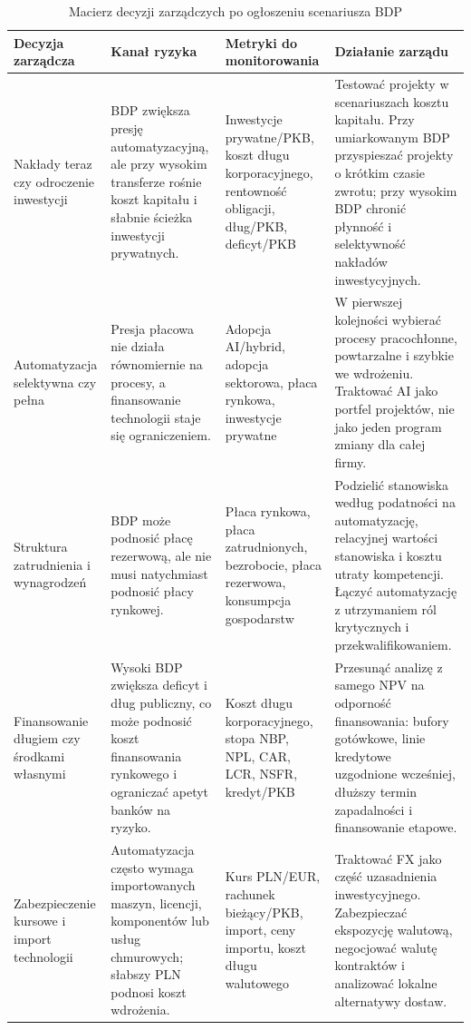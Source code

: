 \begin{table}[H]
\centering
\scriptsize
\caption{Macierz decyzji zarządczych po ogłoszeniu scenariusza BDP}
\label{tab:managerial-decision-matrix}
\begin{tabularx}{\textwidth}{@{}>{\raggedright\arraybackslash}p{}>{\raggedright\arraybackslash}p{}>{\raggedright\arraybackslash}p{}>{\raggedright\arraybackslash}X@{}}
\toprule
\textbf{Decyzja zarządcza} & \textbf{Kanał ryzyka} & \textbf{Metryki do monitorowania} & \textbf{Działanie zarządu} \\
\midrule
Nakłady teraz czy odroczenie inwestycji &
BDP zwiększa presję automatyzacyjną, ale przy wysokim transferze rośnie koszt kapitału i słabnie ścieżka inwestycji prywatnych. &
Inwestycje prywatne/PKB, koszt długu korporacyjnego, rentowność obligacji, dług/PKB, deficyt/PKB &
Testować projekty w scenariuszach kosztu kapitału. Przy umiarkowanym BDP przyspieszać projekty o krótkim czasie zwrotu; przy wysokim BDP chronić płynność i selektywność nakładów inwestycyjnych. \\
\addlinespace
Automatyzacja selektywna czy pełna &
Presja płacowa nie działa równomiernie na procesy, a finansowanie technologii staje się ograniczeniem. &
Adopcja AI/hybrid, adopcja sektorowa, płaca rynkowa, inwestycje prywatne &
W pierwszej kolejności wybierać procesy pracochłonne, powtarzalne i szybkie we wdrożeniu. Traktować AI jako portfel projektów, nie jako jeden program zmiany dla całej firmy. \\
\addlinespace
Struktura zatrudnienia i wynagrodzeń &
BDP może podnosić płacę rezerwową, ale nie musi natychmiast podnosić płacy rynkowej. &
Płaca rynkowa, płaca zatrudnionych, bezrobocie, płaca rezerwowa, konsumpcja gospodarstw &
Podzielić stanowiska według podatności na automatyzację, relacyjnej wartości stanowiska i kosztu utraty kompetencji. Łączyć automatyzację z utrzymaniem ról krytycznych i przekwalifikowaniem. \\
\addlinespace
Finansowanie długiem czy środkami własnymi &
Wysoki BDP zwiększa deficyt i dług publiczny, co może podnosić koszt finansowania rynkowego i ograniczać apetyt banków na ryzyko. &
Koszt długu korporacyjnego, stopa NBP, NPL, CAR, LCR, NSFR, kredyt/PKB &
Przesunąć analizę z samego NPV na odporność finansowania: bufory gotówkowe, linie kredytowe uzgodnione wcześniej, dłuższy termin zapadalności i finansowanie etapowe. \\
\addlinespace
Zabezpieczenie kursowe i import technologii &
Automatyzacja często wymaga importowanych maszyn, licencji, komponentów lub usług chmurowych; słabszy PLN podnosi koszt wdrożenia. &
Kurs PLN/EUR, rachunek bieżący/PKB, import, ceny importu, koszt długu walutowego &
Traktować FX jako część uzasadnienia inwestycyjnego. Zabezpieczać ekspozycję walutową, negocjować walutę kontraktów i analizować lokalne alternatywy dostaw. \\
\bottomrule
\end{tabularx}
\end{table}

